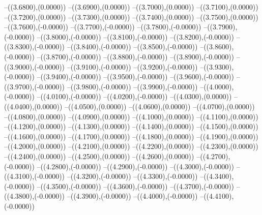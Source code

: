{	--({\sx*(3.6800)},{\sy*(0.0000)})
	--({\sx*(3.6900)},{\sy*(0.0000)})
	--({\sx*(3.7000)},{\sy*(0.0000)})
	--({\sx*(3.7100)},{\sy*(0.0000)})
	--({\sx*(3.7200)},{\sy*(0.0000)})
	--({\sx*(3.7300)},{\sy*(0.0000)})
	--({\sx*(3.7400)},{\sy*(0.0000)})
	--({\sx*(3.7500)},{\sy*(0.0000)})
	--({\sx*(3.7600)},{\sy*(-0.0000)})
	--({\sx*(3.7700)},{\sy*(-0.0000)})
	--({\sx*(3.7800)},{\sy*(-0.0000)})
	--({\sx*(3.7900)},{\sy*(-0.0000)})
	--({\sx*(3.8000)},{\sy*(-0.0000)})
	--({\sx*(3.8100)},{\sy*(-0.0000)})
	--({\sx*(3.8200)},{\sy*(-0.0000)})
	--({\sx*(3.8300)},{\sy*(-0.0000)})
	--({\sx*(3.8400)},{\sy*(-0.0000)})
	--({\sx*(3.8500)},{\sy*(-0.0000)})
	--({\sx*(3.8600)},{\sy*(-0.0000)})
	--({\sx*(3.8700)},{\sy*(-0.0000)})
	--({\sx*(3.8800)},{\sy*(-0.0000)})
	--({\sx*(3.8900)},{\sy*(-0.0000)})
	--({\sx*(3.9000)},{\sy*(-0.0000)})
	--({\sx*(3.9100)},{\sy*(-0.0000)})
	--({\sx*(3.9200)},{\sy*(-0.0000)})
	--({\sx*(3.9300)},{\sy*(-0.0000)})
	--({\sx*(3.9400)},{\sy*(-0.0000)})
	--({\sx*(3.9500)},{\sy*(-0.0000)})
	--({\sx*(3.9600)},{\sy*(-0.0000)})
	--({\sx*(3.9700)},{\sy*(-0.0000)})
	--({\sx*(3.9800)},{\sy*(-0.0000)})
	--({\sx*(3.9900)},{\sy*(-0.0000)})
	--({\sx*(4.0000)},{\sy*(-0.0000)})
	--({\sx*(4.0100)},{\sy*(-0.0000)})
	--({\sx*(4.0200)},{\sy*(-0.0000)})
	--({\sx*(4.0300)},{\sy*(0.0000)})
	--({\sx*(4.0400)},{\sy*(0.0000)})
	--({\sx*(4.0500)},{\sy*(0.0000)})
	--({\sx*(4.0600)},{\sy*(0.0000)})
	--({\sx*(4.0700)},{\sy*(0.0000)})
	--({\sx*(4.0800)},{\sy*(0.0000)})
	--({\sx*(4.0900)},{\sy*(0.0000)})
	--({\sx*(4.1000)},{\sy*(0.0000)})
	--({\sx*(4.1100)},{\sy*(0.0000)})
	--({\sx*(4.1200)},{\sy*(0.0000)})
	--({\sx*(4.1300)},{\sy*(0.0000)})
	--({\sx*(4.1400)},{\sy*(0.0000)})
	--({\sx*(4.1500)},{\sy*(0.0000)})
	--({\sx*(4.1600)},{\sy*(0.0000)})
	--({\sx*(4.1700)},{\sy*(0.0000)})
	--({\sx*(4.1800)},{\sy*(0.0000)})
	--({\sx*(4.1900)},{\sy*(0.0000)})
	--({\sx*(4.2000)},{\sy*(0.0000)})
	--({\sx*(4.2100)},{\sy*(0.0000)})
	--({\sx*(4.2200)},{\sy*(0.0000)})
	--({\sx*(4.2300)},{\sy*(0.0000)})
	--({\sx*(4.2400)},{\sy*(0.0000)})
	--({\sx*(4.2500)},{\sy*(0.0000)})
	--({\sx*(4.2600)},{\sy*(0.0000)})
	--({\sx*(4.2700)},{\sy*(-0.0000)})
	--({\sx*(4.2800)},{\sy*(-0.0000)})
	--({\sx*(4.2900)},{\sy*(-0.0000)})
	--({\sx*(4.3000)},{\sy*(-0.0000)})
	--({\sx*(4.3100)},{\sy*(-0.0000)})
	--({\sx*(4.3200)},{\sy*(-0.0000)})
	--({\sx*(4.3300)},{\sy*(-0.0000)})
	--({\sx*(4.3400)},{\sy*(-0.0000)})
	--({\sx*(4.3500)},{\sy*(-0.0000)})
	--({\sx*(4.3600)},{\sy*(-0.0000)})
	--({\sx*(4.3700)},{\sy*(-0.0000)})
	--({\sx*(4.3800)},{\sy*(-0.0000)})
	--({\sx*(4.3900)},{\sy*(-0.0000)})
	--({\sx*(4.4000)},{\sy*(-0.0000)})
	--({\sx*(4.4100)},{\sy*(-0.0000)})
}
